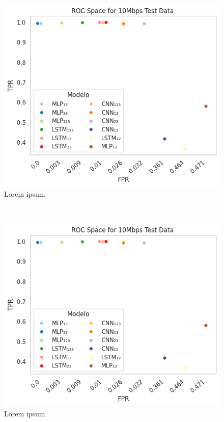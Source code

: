 
	\begin{subfigure}{0.25\textwidth}
	\centering
	\includegraphics[width=1.0\textwidth]{./figs/ROC-Space-Test-Data-10Mbps.png}
	\caption{Lorem ipsum}
\end{subfigure}%
~ 
\begin{subfigure}{0.25\textwidth}
	\centering
	\includegraphics[width=1.0\textwidth]{./figs/ROC-Space-Test-Data-10Mbps.png}
	\caption{Lorem ipsum}
\end{subfigure}
~ 
